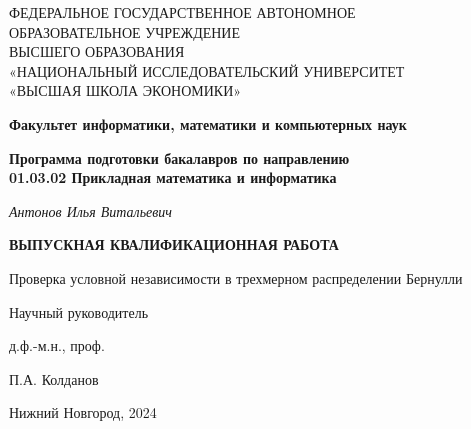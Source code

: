 \thispagestyle{empty}

\begin{center}
    \textsc{
    ФЕДЕРАЛЬНОЕ ГОСУДАРСТВЕННОЕ АВТОНОМНОЕ\\
    ОБРАЗОВАТЕЛЬНОЕ УЧРЕЖДЕНИЕ\\
    ВЫСШЕГО ОБРАЗОВАНИЯ\\
    «НАЦИОНАЛЬНЫЙ ИССЛЕДОВАТЕЛЬСКИЙ УНИВЕРСИТЕТ\\
    «ВЫСШАЯ ШКОЛА ЭКОНОМИКИ»}
\end{center}

\vfill

\begin{center}
    \textbf{Факультет информатики, математики и компьютерных наук}

    \vspace{20pt}

    \textbf{Программа подготовки бакалавров по направлению \\
    01.03.02 Прикладная математика и информатика}
\end{center}

\vfill

\begin{center}
    \textit{Антонов Илья Витальевич} 
    
    \vspace{20pt}
    
    \textbf{ВЫПУСКНАЯ КВАЛИФИКАЦИОННАЯ РАБОТА}

    \vspace{20pt}
    
    Проверка условной независимости в трехмерном распределении Бернулли
\end{center}

\vfill

\begin{flushright}
Научный руководитель

\vspace{5pt}

д.ф.-м.н., проф.

\vspace{5pt}

П.А. Колданов
\end{flushright}

\vfill

\begin{center}
    Нижний Новгород, 2024
\end{center}